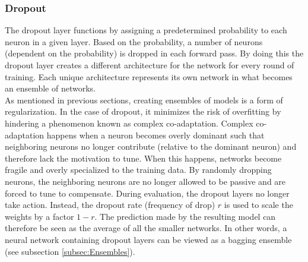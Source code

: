 \subsubsection*{Dropout}\label{subsubsec:Dropout}
The dropout layer functions by assigning a predetermined probability to each neuron in a given layer. Based on the 
probability, a number of neurons (dependent on the probability) is dropped in each forward pass. By doing this the 
dropout layer creates a different architecture for the network for every round of training. Each unique architecture represents 
its own network in what becomes an ensemble of networks. 
\\
As mentioned in previous sections, creating ensembles of models is a form of regularization. In the case of 
dropout, it minimizes the risk of overfitting by hindering a phenomenon known as complex co-adaptation. Complex
co-adaptation happens when a neuron becomes overly dominant such that neighboring neurons no longer contribute (relative
to the dominant neuron) and therefore lack the motivation to tune. When this happens, networks become fragile and overly 
specialized to the training data. By randomly dropping neurons, the neighboring neurons are no longer allowed to be passive 
and are forced to tune to compensate. During evaluation, the dropout layers no longer take action. Instead, the dropout rate 
(frequency of drop) $r$ is used to scale the weights by a factor $1-r$. The prediction made by the resulting 
model can therefore be seen as the average of all the smaller networks. In other words, a neural network containing dropout layers 
can be viewed as a bagging ensemble (see subsection \ref{subsec:Ensembles}). 

